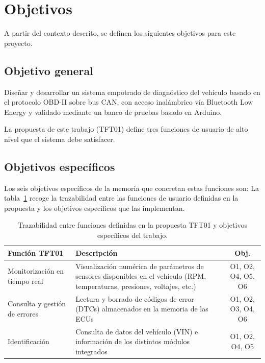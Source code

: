 \section{Objetivos}
\label{sec:objetivos}

A partir del contexto descrito, se definen los siguientes objetivos para este proyecto.

\subsection{Objetivo general}

Diseñar y desarrollar un sistema empotrado de diagnóstico del vehículo basado en el protocolo OBD-II sobre bus CAN, con acceso inalámbrico vía Bluetooth Low Energy y validado mediante un banco de pruebas basado en Arduino.

La propuesta de este trabajo (TFT01) define tres funciones de usuario de alto nivel que el sistema debe satisfacer.

\subsection{Objetivos específicos}

 Los seis objetivos específicos de la memoria que concretan estas funciones son:
La tabla~\ref{tab:tft01_objetivos} recoge la trazabilidad entre las funciones de usuario definidas en la propuesta y los objetivos específicos que las implementan.

\begin{table}[!htbp]
\caption{Trazabilidad entre funciones definidas en la propuesta TFT01 y objetivos específicos del trabajo.}
\label{tab:tft01_objetivos}
\centering
\renewcommand{\arraystretch}{1.3}
\begin{tabular}{|p{4.2cm}|p{8.5cm}|c|}
\hline
\textbf{Función TFT01} & \textbf{Descripción} & \textbf{Obj.} \\
\hline
Monitorización en tiempo real &
  Visualización numérica de parámetros de sensores disponibles en el vehículo (RPM, temperaturas, presiones, voltajes, etc.) &
  O1, O2, O4, O5, O6 \\
\hline
Consulta y gestión de errores &
  Lectura y borrado de códigos de error (DTCs) almacenados en la memoria de las ECUs &
  O1, O2, O3, O4, O6 \\
\hline
Identificación &
  Consulta de datos del vehículo (VIN) e información de los distintos módulos integrados &
  O1, O2, O4, O5 \\
\hline
\end{tabular}
\end{table}


